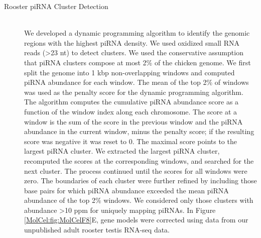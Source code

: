 \begin{description}
    \item[Rooster piRNA Cluster Detection] \hfill \\
    We developed a dynamic programming algorithm to identify the genomic regions with the highest piRNA density. We used oxidized small RNA reads (>23 nt) to detect clusters. We used the conservative assumption that piRNA clusters compose at most 2\% of the chicken genome. We first split the genome into 1 kbp non-overlapping windows and computed piRNA abundance for each window. The mean of the top 2\% of windows was used as the penalty score for the dynamic programming algorithm. The algorithm computes the cumulative piRNA abundance score as a function of the window index along each chromosome. The score at a window is the sum of the score in the previous window and the piRNA abundance in the current window, minus the penalty score; if the resulting score was negative it was reset to 0. The maximal score points to the largest piRNA cluster. We extracted the largest piRNA cluster, recomputed the scores at the corresponding windows, and searched for the next cluster. The process continued until the scores for all windows were zero. The boundaries of each cluster were further refined by including those base pairs for which piRNA abundance exceeded the mean piRNA abundance of the top 2\% windows. We considered only those clusters with abundance >10 ppm for uniquely mapping piRNAs. In Figure \ref{MolCel:fig:MolCelF8}E, gene models were corrected using data from our unpublished adult rooster testis RNA-seq data.

  	\end{description}

